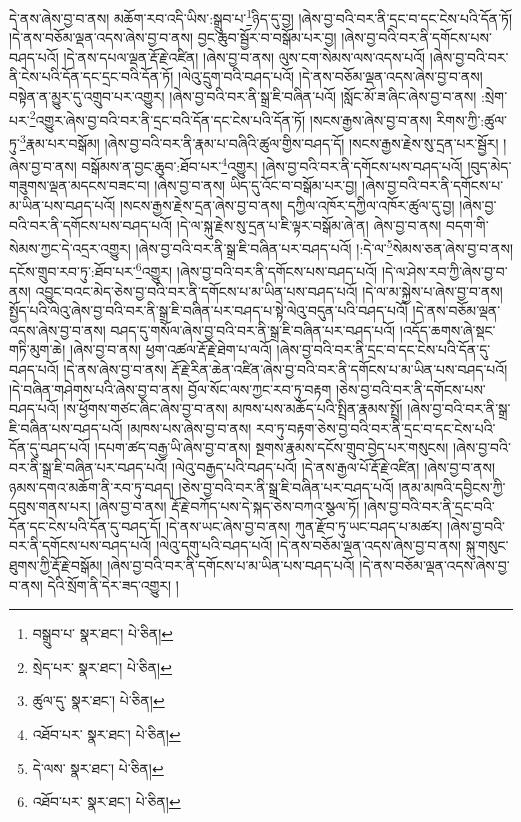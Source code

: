 དེ་ནས་ཞེས་བྱ་བ་ནས། མཆོག་རབ་འདི་ཡིས་:སྒྲུབ་པ་\footnote{བསྒྲུབ་པ་  སྣར་ཐང་།  པེ་ཅིན། }ཉིད་དུ་བྱ། །ཞེས་བྱ་བའི་བར་ནི་དྲང་བ་དང་ངེས་པའི་དོན་ཏོ། །དེ་ནས་བཅོམ་ལྡན་འདས་ཞེས་བྱ་བ་ནས། བྱང་ཆུབ་སྦྱོར་བ་བསྒོམ་པར་བྱ། །ཞེས་བྱ་བའི་བར་ནི་དགོངས་པས་བཤད་པའོ། །དེ་ནས་དཔལ་ལྡན་རྡོ་རྗེ་འཛིན། །ཞེས་བྱ་བ་ནས། ལུས་ངག་སེམས་ལས་འདས་པའོ། །ཞེས་བྱ་བའི་བར་ནི་ངེས་པའི་དོན་དང་དྲང་བའི་དོན་ཏོ། །ལེའུ་དྲུག་བའི་བཤད་པའོ། །དེ་ནས་བཅོམ་ལྡན་འདས་ཞེས་བྱ་བ་ནས། བསྟེན་ན་མྱུར་དུ་འགྲུབ་པར་འགྱུར། །ཞེས་བྱ་བའི་བར་ནི་སྒྲ་ཇི་བཞིན་པའོ། །སློང་མོ་ཟ་ཞིང་ཞེས་བྱ་བ་ནས། :སྲེག་པར་\footnote{སྲེད་པར་  སྣར་ཐང་།  པེ་ཅིན། }འགྱུར་ཞེས་བྱ་བའི་བར་ནི་དྲང་བའི་དོན་དང་ངེས་པའི་དོན་ཏོ། །སངས་རྒྱས་ཞེས་བྱ་བ་ནས། རིགས་ཀྱི་:ཚུལ་ཏུ་\footnote{ཚུལ་དུ་  སྣར་ཐང་།  པེ་ཅིན། }རྣམ་པར་བསྒོམ། །ཞེས་བྱ་བའི་བར་ནི་རྣམ་པ་བཞིའི་ཚུལ་གྱིས་བཤད་དོ། །སངས་རྒྱས་རྗེས་སུ་དྲན་པར་སྦྱོར། །ཞེས་བྱ་བ་ནས། བསྒོམས་ན་བྱང་ཆུབ་:ཐོབ་པར་\footnote{འཐོབ་པར་  སྣར་ཐང་།  པེ་ཅིན། }འགྱུར། །ཞེས་བྱ་བའི་བར་ནི་དགོངས་པས་བཤད་པའོ། །བུད་མེད་གཟུགས་ལྡན་མདངས་བཟང་བ། །ཞེས་བྱ་བ་ནས། ཡིད་དུ་འོང་བ་བསྒོམ་པར་བྱ། །ཞེས་བྱ་བའི་བར་ནི་དགོངས་པ་མ་ཡིན་པས་བཤད་པའོ། །སངས་རྒྱས་རྗེས་དྲན་ཞེས་བྱ་བ་ནས། དཀྱིལ་འཁོར་དཀྱིལ་འཁོར་ཚུལ་དུ་བྱ། །ཞེས་བྱ་བའི་བར་ནི་དགོངས་པས་བཤད་པའོ། །དེ་ལ་སྐུ་རྗེས་སུ་དྲན་པ་ཇི་ལྟར་བསྒོམ་ཞེ་ན། ཞེས་བྱ་བ་ནས། བདག་གི་སེམས་ཀྱང་དེ་འདྲར་འགྱུར། །ཞེས་བྱ་བའི་བར་ནི་སྒྲ་ཇི་བཞིན་པར་བཤད་པའོ། །:དེ་ལ་\footnote{དེ་ལས་  སྣར་ཐང་།  པེ་ཅིན། }སེམས་ཅན་ཞེས་བྱ་བ་ནས། དངོས་གྲུབ་རབ་ཏུ་:ཐོབ་པར་\footnote{འཐོབ་པར་  སྣར་ཐང་།  པེ་ཅིན། }འགྱུར། །ཞེས་བྱ་བའི་བར་ནི་དགོངས་པས་བཤད་པའོ། །དེ་ལ་ཤེས་རབ་ཀྱི་ཞེས་བྱ་བ་ནས། འབྱུང་བའང་མེད་ཅེས་བྱ་བའི་བར་ནི་དགོངས་པ་མ་ཡིན་པས་བཤད་པའོ། །དེ་ལ་མ་སྐྱེས་པ་ཞེས་བྱ་བ་ནས། སྤྱོད་པའི་ལེའུ་ཞེས་བྱ་བའི་བར་ནི་སྒྲ་ཇི་བཞིན་པར་བཤད་པ་སྟེ་ལེའུ་བདུན་པའི་བཤད་པའོ། །དེ་ནས་བཅོམ་ལྡན་འདས་ཞེས་བྱ་བ་ནས། བཤད་དུ་གསོལ་ཞེས་བྱ་བའི་བར་ནི་སྒྲ་ཇི་བཞིན་པར་བཤད་པའོ། །འདོད་ཆགས་ཞེ་སྡང་གཏི་མུག་ཆེ། །ཞེས་བྱ་བ་ནས། ཕྱག་འཚལ་རྡོ་རྗེ་ཐེག་པ་ལའོ། །ཞེས་བྱ་བའི་བར་ནི་དྲང་བ་དང་ངེས་པའི་དོན་དུ་བཤད་པའོ། །དེ་ནས་ཞེས་བྱ་བ་ནས། རྡོ་རྗེ་རིན་ཆེན་འཛིན་ཞེས་བྱ་བའི་བར་ནི་དགོངས་པ་མ་ཡིན་པས་བཤད་པའོ། །དེ་བཞིན་གཤེགས་པའི་ཞེས་བྱ་བ་ནས། བྱོལ་སོང་ལས་ཀྱང་རབ་ཏུ་བརྟག །ཅེས་བྱ་བའི་བར་ནི་དགོངས་པས་བཤད་པའོ། །ས་ཕྱོགས་གཙང་ཞིང་ཞེས་བྱ་བ་ནས། མཁས་པས་མཆོད་པའི་སྤྲིན་རྣམས་སྤྲོ། །ཞེས་བྱ་བའི་བར་ནི་སྒྲ་ཇི་བཞིན་པས་བཤད་པའོ། །མཁས་པས་ཞེས་བྱ་བ་ནས། རབ་ཏུ་བརྟག་ཅེས་བྱ་བའི་བར་ནི་དྲང་བ་དང་ངེས་པའི་དོན་དུ་བཤད་པའོ། །དཔག་ཚད་བརྒྱ་ཡི་ཞེས་བྱ་བ་ནས། སྔགས་རྣམས་དངོས་གྲུབ་བྱེད་པར་གསུངས། །ཞེས་བྱ་བའི་བར་ནི་སྒྲ་ཇི་བཞིན་པར་བཤད་པའོ། །ལེའུ་བརྒྱད་པའི་བཤད་པའོ། །དེ་ནས་རྒྱལ་པོ་རྡོ་རྗེ་འཛིན། །ཞེས་བྱ་བ་ནས། ཉམས་དགའ་མཆོག་ནི་རབ་ཏུ་བཤད། །ཅེས་བྱ་བའི་བར་ནི་སྒྲ་ཇི་བཞིན་པར་བཤད་པའོ། །ནམ་མཁའི་དབྱིངས་ཀྱི་དབུས་གནས་པར། །ཞེས་བྱ་བ་ནས། རྡོ་རྗེ་བཀོད་པས་དེ་སྐད་ཅེས་བཀའ་སྩལ་ཏོ། །ཞེས་བྱ་བའི་བར་ནི་དྲང་བའི་དོན་དང་ངེས་པའི་དོན་དུ་བཤད་དོ། །དེ་ནས་ཡང་ཞེས་བྱ་བ་ནས། ཀུན་རྫོབ་ཏུ་ཡང་བཤད་པ་མཚར། །ཞེས་བྱ་བའི་བར་ནི་དགོངས་པས་བཤད་པའོ། །ལེའུ་དགུ་པའི་བཤད་པའོ། །དེ་ནས་བཅོམ་ལྡན་འདས་ཞེས་བྱ་བ་ནས། སྐུ་གསུང་ཐུགས་ཀྱི་རྡོ་རྗེ་བསྒོམ། །ཞེས་བྱ་བའི་བར་ནི་དགོངས་པ་མ་ཡིན་པས་བཤད་པའོ། །དེ་ནས་བཅོམ་ལྡན་འདས་ཞེས་བྱ་བ་ནས། དེའི་སྲོག་ནི་དེར་ཟད་འགྱུར། །
